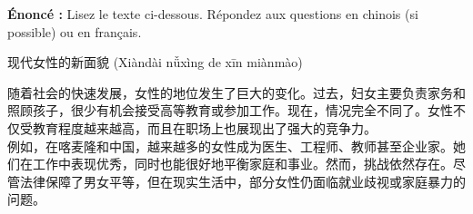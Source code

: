 \documentclass[11pt]{article}
\begin{document}
\begin{exoresolu}
\textbf{Énoncé :} Lisez le texte ci-dessous. Répondez aux questions en chinois (si possible) ou en français.
\begin{textebox}
现代女性的新面貌 (Xiàndài nǚxìng de xīn miànmào)

随着社会的快速发展，女性的地位发生了巨大的变化。过去，妇女主要负责家务和照顾孩子，很少有机会接受高等教育或参加工作。现在，情况完全不同了。女性不仅受教育程度越来越高，而且在职场上也展现出了强大的竞争力。\\

例如，在喀麦隆和中国，越来越多的女性成为医生、工程师、教师甚至企业家。她们在工作中表现优秀，同时也能很好地平衡家庭和事业。然而，挑战依然存在。尽管法律保障了男女平等，但在现实生活中，部分女性仍面临就业歧视或家庭暴力的问题。\\


\end{textebox}
\end{exoresolu}
\end{document}

